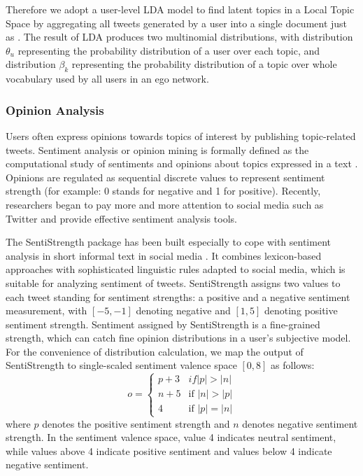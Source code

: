 \documentclass[letterpaper]{article}
\begin{document}
Therefore we adopt a user-level LDA model to find latent topics in a Local Topic Space by aggregating all tweets generated by a user into a single document just as \cite{Hong:2010EST}. 
The result of LDA produces two multinomial distributions, with distribution $ \theta_{u} $ representing the probability distribution of a user over each topic, and distribution $ \beta_{k} $ representing the probability distribution of a topic over whole vocabulary used by all users in an ego network. 

\subsubsection{Opinion Analysis}
\label{opinion}

Users often express opinions towards topics of interest by publishing topic-related tweets. 
Sentiment analysis or opinion mining is formally defined as the computational study of sentiments and opinions about topics expressed in a text \cite{liu2012sentiment}. Opinions are regulated as sequential discrete values to represent sentiment strength (for example: 0 stands for negative and 1 for positive). Recently, researchers began to pay more and more attention to social media such as Twitter \cite{Thelwall:2010SSS,Thelwall:2012SSD,Hu:2013www} and provide effective sentiment analysis tools. 

The SentiStrength package has been built especially to cope with sentiment analysis in short informal text in social media \cite{Thelwall:2010SSS}. 
It combines lexicon-based approaches with sophisticated linguistic rules adapted to social media, which is suitable for analyzing sentiment of tweets.
SentiStrength assigns two values to each tweet standing for sentiment strengths: a positive and a negative sentiment measurement, with $ \left[ -5,-1 \right]  $ denoting negative and $ \left[ 1,5 \right]  $ denoting positive sentiment strength.
Sentiment assigned by SentiStrength is a fine-grained strength, which can catch fine opinion distributions in a user's subjective model.  
For the convenience of distribution calculation, we map the output of SentiStrength to single-scaled sentiment valence space $ \left[ 0, 8 \right] $ as follows:
\begin{equation}
\label{opinionmap}
o= \left\{ 
\begin{array}{lll}
{p+3} & if \vert p \vert > \vert n \vert \\
{n+5} & \text{if } \vert n \vert > \vert p \vert \\
{4}  & \text{if } \vert p \vert = \vert n \vert
\end{array}
\right.
\end{equation}
where $ p $ denotes the positive sentiment strength and $ n $ denotes negative sentiment strength.
In the sentiment valence space, value 4 indicates neutral sentiment, while values above 4 indicate positive sentiment and values below 4 indicate negative sentiment. 
\end{document}
